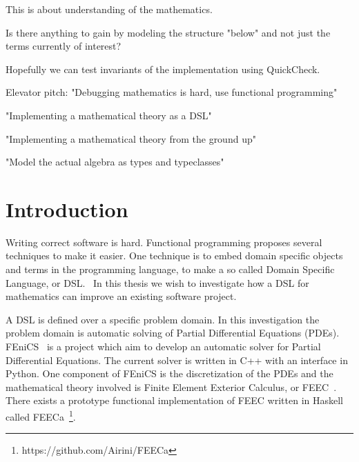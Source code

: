 \documentclass{scrartcl}
\begin{document}
This is about understanding of the mathematics.

Is there anything to gain by modeling the structure "below" and not just the
terms currently of interest?

Hopefully we can test invariants of the implementation using QuickCheck.

Elevator pitch: "Debugging mathematics is hard, use functional programming"

"Implementing a mathematical theory as a DSL"

"Implementing a mathematical theory from the ground up"

"Model the actual algebra as types and typeclasses"















\section{Introduction}



Writing correct software is hard.  Functional programming proposes several
techniques to make it easier.  One technique is to embed domain specific
objects and terms in the programming language, to make a so called Domain
Specific Language, or DSL.~\cite{van2000domain} In this thesis we wish to
investigate how a DSL for mathematics can improve an existing software project.

A DSL is defined over a specific problem domain. In this investigation the
problem domain is automatic solving of Partial Differential Equations (PDEs).
FEniCS~\cite{AlnaesBlechta2015a} is a project which aim to develop an automatic
solver for Partial Differential Equations.  The current solver is written in
C++ with an interface in Python. One component of FEniCS is the discretization
of the PDEs and the mathematical theory involved is Finite Element Exterior
Calculus, or FEEC~\cite{arnold2006finite}.  There exists a prototype functional
implementation of FEEC written in Haskell called
FEECa~\footnote{https://github.com/Airini/FEECa}.
\end{document}
